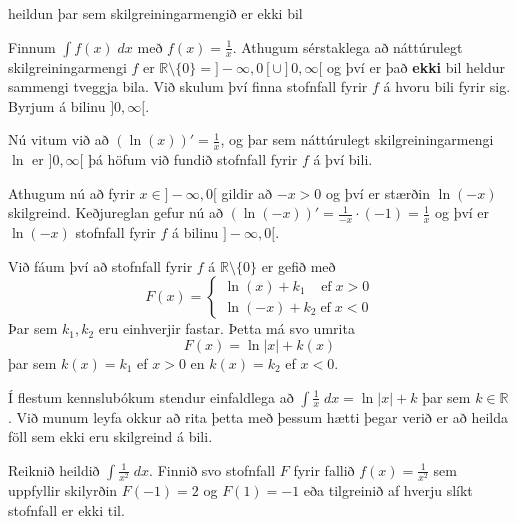 \begin{syn}{heildun þar sem skilgreiningarmengið er ekki bil}

Finnum $\displaystyle \int f(x)\; dx$ með $f(x) = \frac{1}{x}$. Athugum sérstaklega að náttúrulegt skilgreiningarmengi $f$ er $\mathbb{R}\setminus \{0\} = ]-\infty,0[ \cup ]0,\infty[$ og því er það \textbf{ekki} bil heldur sammengi tveggja bila. Við skulum því finna stofnfall fyrir $f$ á hvoru bili fyrir sig. Byrjum á bilinu $]0,\infty[$.

\vspace{2mm}

Nú vitum við að $\left(\ln(x)\right)' = \frac{1}{x}$, og þar sem náttúrulegt skilgreiningarmengi $\ln$ er $]0,\infty[$ þá höfum við fundið stofnfall fyrir $f$ á því bili.

\vspace{2mm}

Athugum nú að fyrir $x \in ]-\infty,0[$ gildir að $-x > 0$ og því er stærðin $\ln(-x)$ skilgreind. Keðjureglan gefur nú að $\left(\ln(-x)\right)' = \frac{1}{-x}\cdot(-1) = \frac{1}{x}$ og því er $\ln(-x)$ stofnfall fyrir $f$ á bilinu $]-\infty,0[$.

\vspace{2mm}

Við fáum því að stofnfall fyrir $f$ á $\mathbb{R}\setminus \{0\}$ er gefið með
$$
F(x) = \begin{cases} \ln(x) + k_1 \;\;\;\; \text{ef} \; x > 0\\ \ln(-x) + k_2 \; \text{ef} \; x < 0\end{cases}
$$
Þar sem $k_1,k_2$ eru einhverjir fastar. Þetta má svo umrita 
$$
F(x) = \ln|x|+k(x)
$$
þar sem $k(x) = k_1$ ef $x > 0$ en $k(x) = k_2$ ef $x < 0$.

\end{syn}

\begin{ath}
Í flestum kennslubókum stendur einfaldlega að $\displaystyle \int \frac{1}{x} \; dx = \ln|x| + k$ þar sem $k \in \mathbb{R}$. Við munum leyfa okkur að rita þetta með þessum hætti þegar verið er að heilda föll sem ekki eru skilgreind á bili.
\end{ath}

\begin{æd}
Reiknið heildið $\displaystyle \int \frac{1}{x^{2}} \; dx$. Finnið svo stofnfall $F$ fyrir fallið $f(x) = \frac{1}{x^{2}}$ sem uppfyllir skilyrðin $F(-1) = 2$ og $F(1) = -1$ eða tilgreinið af hverju slíkt stofnfall er ekki til.
\end{æd}

